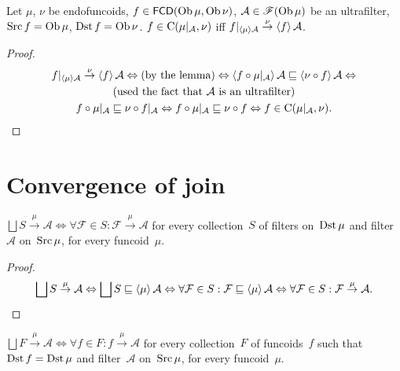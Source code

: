 \begin{thm}
Let $\mu$, $\nu$ be endofuncoids, $f\in\mathsf{FCD}(\operatorname{Ob}\mu,\operatorname{Ob}\nu)$,
$\mathcal{A}\in\mathscr{F}(\operatorname{Ob}\mu)$ be an ultrafilter, $\operatorname{Src} f=\operatorname{Ob}\mu$,
$\operatorname{Dst} f=\operatorname{Ob}\nu$. $f\in\mathrm{C}(\mu|_{\mathcal{A}},\nu)$ iff $f|_{\left\langle \mu\right\rangle\mathcal{A}}\overset{\nu}{\rightarrow}\left\langle f\right\rangle\mathcal{A}$.\end{thm}
\begin{proof}
~
\begin{multline*}
f|_{\left\langle \mu\right\rangle\mathcal{A}}\overset{\nu}{\rightarrow}\left\langle f\right\rangle\mathcal{A}\Leftrightarrow\text{(by the lemma)}\Leftrightarrow\left\langle f\circ\mu|_{\mathcal{A}}\right\rangle\mathcal{A}\sqsubseteq\left\langle \nu\circ f\right\rangle\mathcal{A}\Leftrightarrow\\
\text{(used the fact that \ensuremath{\mathcal{A}} is an ultrafilter)}\\
f\circ\mu|_{\mathcal{A}}\sqsubseteq\nu\circ f|_{\mathcal{A}}\Leftrightarrow f\circ\mu|_{\mathcal{A}}\sqsubseteq\nu\circ f\Leftrightarrow f\in\mathrm{C}(\mu|_{\mathcal{A}},\nu).
\end{multline*}

\end{proof}

\section{Convergence of join}

\begin{prop}
$\bigsqcup S\overset{\mu}{\rightarrow}\mathcal{A} \Leftrightarrow \forall\mathcal{F}\in S:\mathcal{F}\overset{\mu}{\rightarrow}\mathcal{A}$
for every collection~$S$ of filters on~$\operatorname{Dst}\mu$ and filter~$\mathcal{A}$ on~$\operatorname{Src}\mu$, for every funcoid~$\mu$.
\end{prop}

\begin{proof}
~
\[\bigsqcup S\overset{\mu}{\rightarrow}\mathcal{A} \Leftrightarrow \bigsqcup S\sqsubseteq\supfun{\mu}\mathcal{A} \Leftrightarrow
\forall\mathcal{F}\in S:\mathcal{F}\sqsubseteq\supfun{\mu}\mathcal{A} \Leftrightarrow \forall\mathcal{F}\in S:\mathcal{F}\overset{\mu}{\rightarrow}\mathcal{A}.\]
\end{proof}

\begin{cor}
$\bigsqcup F\overset{\mu}{\rightarrow}\mathcal{A} \Leftrightarrow \forall f\in F:f\overset{\mu}{\rightarrow}\mathcal{A}$
for every collection~$F$ of funcoids~$f$ such that $\operatorname{Dst} f=\operatorname{Dst}\mu$ and filter~$\mathcal{A}$ on~$\operatorname{Src}\mu$, for every funcoid~$\mu$.
\end{cor}

